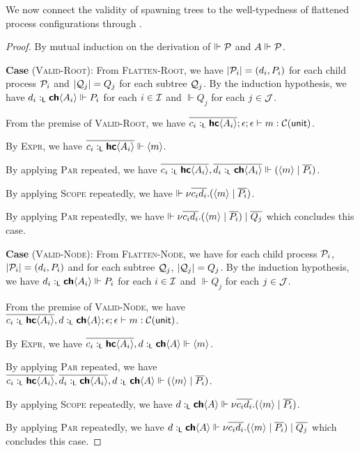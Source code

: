 We now connect the validity of spawning trees to the well-typedness of flattened process configurations
through .
\begin{proof}
  By mutual induction on the derivation of $\Vdash \mathcal{P}$ and $A \Vdash \mathcal{P}$.

\noindent
\textbf{Case} (\textsc{Valid-Root}):
  From \textsc{Flatten-Root}, we have
  $| \mathcal{P}_i | = (d_i, P_i)$ for each child process $\mathcal{P}_i$ and
  $| \mathcal{Q}_j | = Q_j$ for each subtree $\mathcal{Q}_j$.
  By the induction hypothesis, we have $d_i :_{\textsf{L}} {\textbf{\textsf{ch}}\langle{A_i}\rangle} \Vdash P_i$ for each $i \in \mathcal{I}$
  and $\Vdash Q_j$ for each $j \in \mathcal{J}$.

  \noindent
  From the premise of \textsc{Valid-Root}, we have
  $\overline{c_i :_{\textsf{L}} {\textbf{\textsf{hc}}\langle{A_i}\rangle}} ; \epsilon ; \epsilon \vdash m :\mathcal{C}({\textsf{unit}})$.

  \noindent
  By \textsc{Expr}, we have
  $\overline{c_i :_{\textsf{L}} {\textbf{\textsf{hc}}\langle{A_i}\rangle}} \Vdash {\langle{m}\rangle}$.

  \noindent
  By applying \textsc{Par} repeated, we have
  $\overline{c_i :_{\textsf{L}} {\textbf{\textsf{hc}}\langle{A_i}\rangle}}, \overline{d_i :_{\textsf{L}} {\textbf{\textsf{ch}}\langle{A_i}\rangle}} \Vdash ({\langle{m}\rangle} \mid \overline{P_i})$.

  \noindent
  By applying \textsc{Scope} repeatedly, we have
  $\Vdash {\nu{\overline{c_i d_i}}.{({\langle{m}\rangle} \mid \overline{P_i})}}$.

  \noindent
  By applying \textsc{Par} repeatedly, we have
  $\Vdash {\nu{\overline{c_i d_i}}.{({\langle{m}\rangle} \mid \overline{P_i})}} \mid \overline{Q_j}$
  which concludes this case.

\textbf{Case} (\textsc{Valid-Node}):
  From \textsc{Flatten-Node}, we have for each child process $\mathcal{P}_i$, $| \mathcal{P}_i | = (d_i, P_i)$ and
  for each subtree $\mathcal{Q}_j$, $| \mathcal{Q}_j | = Q_j$.
  By the induction hypothesis, we have $d_i :_{\textsf{L}} {\textbf{\textsf{ch}}\langle{A_i}\rangle} \Vdash P_i$ for each $i \in \mathcal{I}$
  and $\Vdash Q_j$ for each $j \in \mathcal{J}$.

  \noindent
  From the premise of \textsc{Valid-Node}, we have
  $\overline{c_i :_{\textsf{L}} {\textbf{\textsf{hc}}\langle{A_i}\rangle}}, d :_{\textsf{L}} {\textbf{\textsf{ch}}\langle{A}\rangle} ; \epsilon ; \epsilon \vdash m :\mathcal{C}({\textsf{unit}})$.

  \noindent
  By \textsc{Expr}, we have
  $\overline{c_i :_{\textsf{L}} {\textbf{\textsf{hc}}\langle{A_i}\rangle}}, d :_{\textsf{L}} {\textbf{\textsf{ch}}\langle{A}\rangle} \Vdash {\langle{m}\rangle}$.

  \noindent
  By applying \textsc{Par} repeated, we have
  $\overline{c_i :_{\textsf{L}} {\textbf{\textsf{hc}}\langle{A_i}\rangle}}, \overline{d_i :_{\textsf{L}} {\textbf{\textsf{ch}}\langle{A_i}\rangle}}, d :_{\textsf{L}} {\textbf{\textsf{ch}}\langle{A}\rangle} \Vdash ({\langle{m}\rangle} \mid \overline{P_i})$.

  \noindent
  By applying \textsc{Scope} repeatedly, we have
  $d :_{\textsf{L}} {\textbf{\textsf{ch}}\langle{A}\rangle} \Vdash {\nu{\overline{c_i d_i}}.{({\langle{m}\rangle} \mid \overline{P_i})}}$.

  \noindent
  By applying \textsc{Par} repeatedly, we have
  ${d :_{\textsf{L}} {\textbf{\textsf{ch}}\langle{A}\rangle} \Vdash {\nu{\overline{c_i d_i}}.{({\langle{m}\rangle} \mid \overline{P_i})}} \mid \overline{Q_j}}$
  which concludes this case.
\end{proof}

